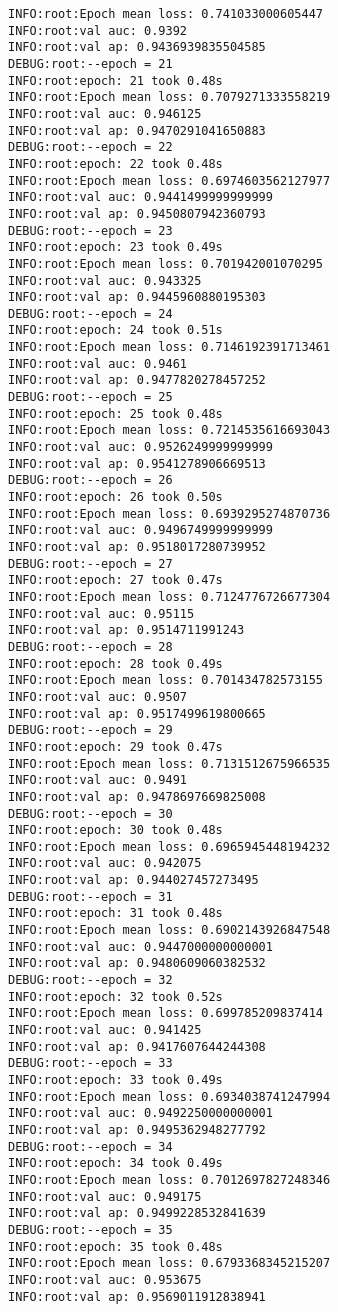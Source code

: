 \documentclass[11pt]{article}
\begin{document}
\begin{verbatim}
INFO:root:Epoch mean loss: 0.741033000605447
INFO:root:val auc: 0.9392
INFO:root:val ap: 0.9436939835504585
DEBUG:root:--epoch = 21
INFO:root:epoch: 21 took 0.48s
INFO:root:Epoch mean loss: 0.7079271333558219
INFO:root:val auc: 0.946125
INFO:root:val ap: 0.9470291041650883
DEBUG:root:--epoch = 22
INFO:root:epoch: 22 took 0.48s
INFO:root:Epoch mean loss: 0.6974603562127977
INFO:root:val auc: 0.9441499999999999
INFO:root:val ap: 0.9450807942360793
DEBUG:root:--epoch = 23
INFO:root:epoch: 23 took 0.49s
INFO:root:Epoch mean loss: 0.701942001070295
INFO:root:val auc: 0.943325
INFO:root:val ap: 0.9445960880195303
DEBUG:root:--epoch = 24
INFO:root:epoch: 24 took 0.51s
INFO:root:Epoch mean loss: 0.7146192391713461
INFO:root:val auc: 0.9461
INFO:root:val ap: 0.9477820278457252
DEBUG:root:--epoch = 25
INFO:root:epoch: 25 took 0.48s
INFO:root:Epoch mean loss: 0.7214535616693043
INFO:root:val auc: 0.9526249999999999
INFO:root:val ap: 0.9541278906669513
DEBUG:root:--epoch = 26
INFO:root:epoch: 26 took 0.50s
INFO:root:Epoch mean loss: 0.6939295274870736
INFO:root:val auc: 0.9496749999999999
INFO:root:val ap: 0.9518017280739952
DEBUG:root:--epoch = 27
INFO:root:epoch: 27 took 0.47s
INFO:root:Epoch mean loss: 0.7124776726677304
INFO:root:val auc: 0.95115
INFO:root:val ap: 0.9514711991243
DEBUG:root:--epoch = 28
INFO:root:epoch: 28 took 0.49s
INFO:root:Epoch mean loss: 0.701434782573155
INFO:root:val auc: 0.9507
INFO:root:val ap: 0.9517499619800665
DEBUG:root:--epoch = 29
INFO:root:epoch: 29 took 0.47s
INFO:root:Epoch mean loss: 0.7131512675966535
INFO:root:val auc: 0.9491
INFO:root:val ap: 0.9478697669825008
DEBUG:root:--epoch = 30
INFO:root:epoch: 30 took 0.48s
INFO:root:Epoch mean loss: 0.6965945448194232
INFO:root:val auc: 0.942075
INFO:root:val ap: 0.944027457273495
DEBUG:root:--epoch = 31
INFO:root:epoch: 31 took 0.48s
INFO:root:Epoch mean loss: 0.6902143926847548
INFO:root:val auc: 0.9447000000000001
INFO:root:val ap: 0.9480609060382532
DEBUG:root:--epoch = 32
INFO:root:epoch: 32 took 0.52s
INFO:root:Epoch mean loss: 0.699785209837414
INFO:root:val auc: 0.941425
INFO:root:val ap: 0.9417607644244308
DEBUG:root:--epoch = 33
INFO:root:epoch: 33 took 0.49s
INFO:root:Epoch mean loss: 0.6934038741247994
INFO:root:val auc: 0.9492250000000001
INFO:root:val ap: 0.9495362948277792
DEBUG:root:--epoch = 34
INFO:root:epoch: 34 took 0.49s
INFO:root:Epoch mean loss: 0.7012697827248346
INFO:root:val auc: 0.949175
INFO:root:val ap: 0.9499228532841639
DEBUG:root:--epoch = 35
INFO:root:epoch: 35 took 0.48s
INFO:root:Epoch mean loss: 0.6793368345215207
INFO:root:val auc: 0.953675
INFO:root:val ap: 0.9569011912838941

\end{verbatim}
\end{document}
